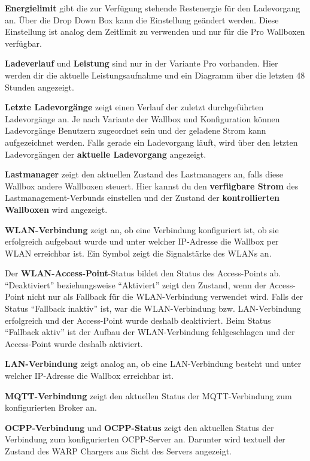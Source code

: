 \documentclass[a4paper,10pt]{article}
\begin{document}
\begin{multicols*}{2}
    \textbf{Energielimit} gibt die zur Verfügung stehende Restenergie für den
    Ladevorgang an. Über die Drop Down Box kann die Einstellung geändert werden.
    Diese Einstellung ist analog dem Zeitlimit zu verwenden und nur für die Pro Wallboxen verfügbar.

    \textbf{Ladeverlauf} und \textbf{Leistung} sind nur in der Variante Pro
    vorhanden. Hier werden dir die aktuelle Leistungsaufnahme und ein Diagramm über
    die letzten 48 Stunden angezeigt.

    \textbf{Letzte Ladevorgänge} zeigt einen Verlauf der zuletzt durchgeführten Ladevorgänge an.
    Je nach Variante der Wallbox und Konfiguration können Ladevorgänge Benutzern zugeordnet sein
    und der geladene Strom kann aufgezeichnet werden. Falls gerade ein Ladevorgang läuft, wird über den letzten Ladevorgängen der \textbf{aktuelle Ladevorgang} angezeigt.

    \textbf{Lastmanager} zeigt den aktuellen Zustand des Lastmanagers an, falls diese Wallbox
    andere Wallboxen steuert. Hier kannst du den \textbf{verfügbare Strom} des Lastmanagement-Verbunds
    einstellen und der Zustand der \textbf{kontrollierten Wallboxen} wird angezeigt.

    \textbf{WLAN-Verbindung} zeigt an, ob eine Verbindung konfiguriert ist, ob sie erfolgreich aufgebaut wurde und
    unter welcher IP-Adresse die Wallbox per WLAN erreichbar ist. Ein Symbol
    zeigt die Signalstärke des WLANs an.

    Der \textbf{WLAN-Access-Point}-Status bildet den Status des Access-Points ab.
    \enquote{Deaktiviert} beziehungsweise \enquote{Aktiviert} zeigt den Zustand, wenn der Access-Point nicht
    nur als Fallback für die WLAN-Verbindung verwendet wird. Falls der Status \enquote{Fallback inaktiv} ist,
    war die WLAN-Verbindung bzw. LAN-Verbindung erfolgreich und der Access-Point wurde deshalb deaktiviert.
    Beim Status \enquote{Fallback aktiv} ist der Aufbau der WLAN-Verbindung fehlgeschlagen und der
    Access-Point wurde deshalb aktiviert.

    \textbf{LAN-Verbindung} zeigt analog an, ob eine LAN-Verbindung besteht und unter welcher IP-Adresse die Wallbox erreichbar ist.

    \textbf{MQTT-Verbindung} zeigt den aktuellen Status der MQTT-Verbindung
    zum konfigurierten Broker an.

    \textbf{OCPP-Verbindung} und \textbf{OCPP-Status} zeigt den aktuellen Status der Verbindung zum konfigurierten OCPP-Server an.
    Darunter wird textuell der Zustand des WARP Chargers aus Sicht des Servers angezeigt.


\end{multicols*}
\end{document}
